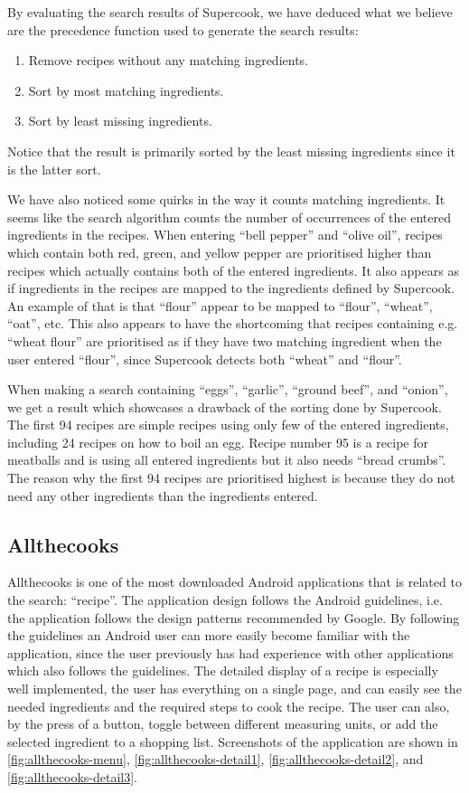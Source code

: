By evaluating the search results of Supercook, we have deduced what we believe are the precedence function used to generate the search results:
\begin{enumerate}
	\item Remove recipes without any matching ingredients.
	\item Sort by most matching ingredients.
	\item Sort by least missing ingredients.
\end{enumerate}
Notice that the result is primarily sorted by the least missing ingredients since it is the latter sort.

We have also noticed some quirks in the way it counts matching ingredients. It seems like the search algorithm counts the number of occurrences of the entered ingredients in the recipes. When entering ``bell pepper'' and ``olive oil'', recipes which contain both red, green, and yellow pepper are prioritised higher than recipes which actually contains both of the entered ingredients. It also appears as if ingredients in the recipes are mapped to the ingredients defined by Supercook. An example of that is that ``flour'' appear to be mapped to ``flour'', ``wheat'', ``oat'', etc. This also appears to have the shortcoming that recipes containing e.g. ``wheat flour'' are prioritised as if they have two matching ingredient when the user entered ``flour'', since Supercook detects both ``wheat'' and ``flour''.

When making a search containing ``eggs'', ``garlic'', ``ground beef'', and ``onion'', we get a result which showcases a drawback of the sorting done by Supercook. The first 94 recipes are simple recipes using only few of the entered ingredients, including 24 recipes on how to boil an egg. Recipe number 95 is a recipe for meatballs and is using all entered ingredients but it also needs ``bread crumbs''. The reason why the first 94 recipes are prioritised highest is because they do not need any other ingredients than the ingredients entered.

\subsection{Allthecooks}
Allthecooks is one of the most downloaded \cite{allthecooks-googleplay} Android applications that is related to the search: ``recipe''. The application design follows the Android guidelines\cite{guidelines-appstructure}, i.e. the application follows the design patterns recommended by Google. By following the guidelines an Android user can more easily become familiar with the application, since the user previously has had experience with other applications which also follows the guidelines. 
The detailed display of a recipe is especially well implemented, the user has everything on a single page, and can easily see the needed ingredients and the required steps to cook the recipe. The user can also, by the press of a button, toggle between different measuring units, or add the selected ingredient to a shopping list. Screenshots of the application are shown in \autoref{fig:allthecooks-menu}, \ref{fig:allthecooks-detail1}, \ref{fig:allthecooks-detail2}, and \ref{fig:allthecooks-detail3}.


